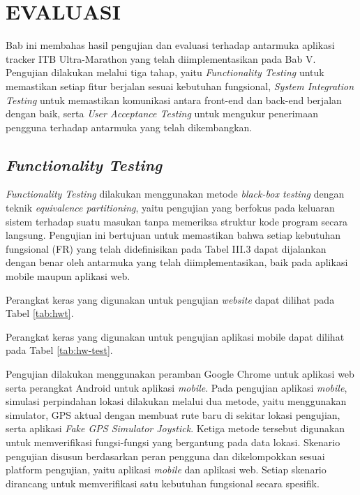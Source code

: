 \cleardoublepage
\chapter{EVALUASI}
\label{chap:evaluasi}
Bab ini membahas hasil pengujian dan evaluasi terhadap antarmuka aplikasi tracker ITB Ultra-Marathon yang telah diimplementasikan pada Bab V. Pengujian dilakukan melalui tiga tahap, yaitu \textit{Functionality Testing} untuk memastikan setiap fitur berjalan sesuai kebutuhan fungsional, \textit{System Integration Testing} untuk memastikan komunikasi antara front-end dan back-end berjalan dengan baik, serta \textit{User Acceptance Testing} untuk mengukur penerimaan pengguna terhadap antarmuka yang telah dikembangkan.

\section{\textit{Functionality Testing}}
\textit{Functionality Testing} dilakukan menggunakan metode \textit{black-box testing} dengan teknik \textit{equivalence partitioning}, yaitu pengujian yang berfokus pada keluaran sistem terhadap suatu masukan tanpa memeriksa struktur kode program secara langsung. Pengujian ini bertujuan untuk memastikan bahwa setiap kebutuhan fungsional (FR) yang telah didefinisikan pada Tabel III.3 dapat dijalankan dengan benar oleh antarmuka yang telah diimplementasikan, baik pada aplikasi mobile maupun aplikasi web.

Perangkat keras yang digunakan untuk pengujian \textit{website} dapat dilihat pada Tabel \ref{tab:hwt}.


Perangkat keras yang digunakan untuk pengujian aplikasi mobile dapat dilihat pada Tabel \ref{tab:hw-test}.


Pengujian dilakukan menggunakan peramban Google Chrome untuk aplikasi web serta perangkat Android untuk aplikasi \textit{mobile}. Pada pengujian aplikasi \textit{mobile}, simulasi perpindahan lokasi dilakukan melalui dua metode, yaitu menggunakan simulator, GPS aktual dengan membuat rute baru di sekitar lokasi pengujian, serta aplikasi \textit{Fake GPS Simulator Joystick}. Ketiga metode tersebut digunakan untuk memverifikasi fungsi-fungsi yang bergantung pada data lokasi. Skenario pengujian disusun berdasarkan peran pengguna dan dikelompokkan sesuai platform pengujian, yaitu aplikasi \textit{mobile} dan aplikasi web. Setiap skenario dirancang untuk memverifikasi satu kebutuhan fungsional secara spesifik.

